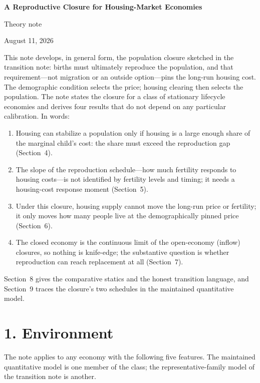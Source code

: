 \documentclass[11pt]{article}
\theoremstyle{definition}
\begin{document}
\begin{center}
{\LARGE\bfseries A Reproductive Closure for Housing-Market Economies}\par
\vspace{3pt}
{\large Theory note}\par
\vspace{3pt}
{\small August 11, 2026}
\end{center}

\vspace{-2pt}
This note develops, in general form, the population closure sketched in the
transition note: births must ultimately reproduce the population, and that
requirement---not migration or an outside option---pins the long-run housing
cost. The demographic condition selects the price; housing clearing then
selects the population. The note states the closure for a class of stationary
lifecycle economies and derives four results that do not depend on any
particular calibration. In words:

\begin{enumerate}
\item Housing can stabilize a population only if housing is a large enough
share of the marginal child's cost: the share must exceed the reproduction gap
(Section~4).
\item The slope of the reproduction schedule---how much fertility responds to
housing costs---is not identified by fertility levels and timing; it needs a
housing-cost response moment (Section~5).
\item Under this closure, housing supply cannot move the long-run price or
fertility; it only moves how many people live at the demographically pinned
price (Section~6).
\item The closed economy is the continuous limit of the open-economy
(inflow) closures, so nothing is knife-edge; the substantive question is
whether reproduction can reach replacement at all (Section~7).
\end{enumerate}

Section~8 gives the comparative statics and the honest transition language,
and Section~9 traces the closure's two schedules in the maintained
quantitative model.

\section*{1. Environment}

The note applies to any economy with the following five features. The
maintained quantitative model is one member of the class; the representative-family
model of the transition note is another.
\end{document}
